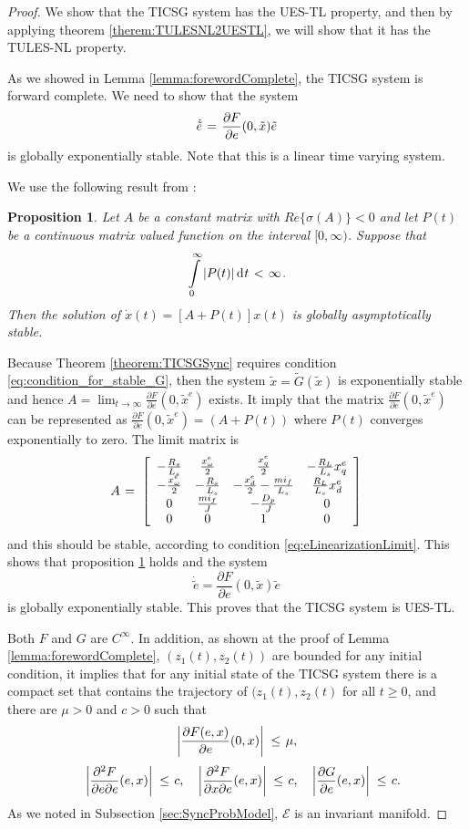 \documentclass[letterpaper, 10 pt, conference]{ieeeconf}
\newtheorem{proposition}[theorem]{Proposition}
\renewcommand{\o}    {{\omega}}
\newcommand{\m}      {{\hbox{\hskip 1pt}}}
\newcommand{\dd}     {{\rm d\hbox{\hskip 0.5pt}}}
\newcommand{\Emscr}  {{\mathcal{E}}}
\begin{document}
\begin{proof}
We show that the TICSG system has the UES-TL property, and then by
applying theorem \ref{therem:TULESNL2UESTL}, we will show that it has
the TULES-NL property.

As we showed in Lemma \ref{lemma:forewordComplete}, the TICSG system
is forward complete. We need to show that the system
$$ \dot{\tilde{e}} \m=\m \frac{\partial F}{\partial e}(0,\tilde{x})
   \tilde{e}$$
is globally exponentially stable. Note that this is a linear time
varying system.

We use the following result from \cite[Theorem 4.2.7]
{SchovanecGilliam1999}:

\begin{proposition}\label{proposition:LTVStability}
Let $A$ be a constant matrix with $Re\{\sigma(A)\}<0$ and let $P(t)$
be a continuous matrix valued function on the interval
$[0,\infty)$. Suppose that
$$\intop_0^\infty \left|P(t)\right| \dd t \m<\m \infty \m.$$
Then the solution of $\dot{x}(t)=[A+P(t)]x(t)$ is globally 
asymptotically stable.
\end{proposition}
 
Because Theorem \ref{theorem:TICSGSync} requires condition
\eqref{eq:condition_for_stable_G}, then the system $\tilde{x}=
\tilde{G}(\tilde{x})$ is exponentially stable and hence $A =
\lim_{t \to \infty}\frac{\partial F}{\partial e}(0,\tilde{x}^e)$
exists.  It imply that the matrix $\frac{\partial F}{\partial
e}(0,\tilde{x}^e)$ can be represented as $\frac{\partial F}{\partial
e}(0,\tilde{x}^e) = \left(A+P(t)\right)$ where $P(t)$ converges
exponentially to zero. The limit matrix is
$$ A \m=\m \left[\begin{array}{cccc} -\frac{R_{s}}{L_s} & 
   \frac{x^e_\o}{2} & \frac{x^e_q}{2} & -\frac{R_L}{L_s} x^e_q\\
   -\frac{x^e_\o}{2} & -\frac{R_s}{L_s} & -\frac{x^e_d}{2}-\frac
   {mi_f}{L_s} & \frac{R_L}{L_s} x^e_d\\ 0 & \frac{mi_f}{J} & 
   -\frac{D_p}{J} & 0\\ 0 & 0 & 1 & 0 \end{array}\right]$$
and this should be stable, according to condition
\eqref{eq:eLinearizationLimit}. This shows that proposition
\ref{proposition:LTVStability} holds and the system
$$ \dot{\tilde{e}}=\frac{\partial F}{\partial e}(0,\tilde{x})
   \tilde{e}$$
is globally exponentially stable. This proves that the TICSG system
is UES-TL. 

Both $F$ and $G$ are $C^\infty$. In addition, as shown at the proof of
Lemma \ref{lemma:forewordComplete}, $\left(z_1(t),z_2(t)\right)$ are
bounded for any initial condition, it implies that for any initial
state of the TICSG system there is a compact set that contains the
trajectory of $(z_1(t),z_2(t)$ for all $t\geq 0$, and there are
$\mu>0$ and $c>0$ such that
$$\left|\frac{\partial F(e,x)}{\partial e}(0,x)\right| \m\leq\m \mu,$$
$$ \quad \left| \frac{\partial^2 F}{\partial e \partial e}(e,x)\right|
   \m\leq\m c, \quad \left| \frac{\partial^2 F}{\partial x \partial e}
   (e,x)\right| \m\leq\m c,\quad\left| \frac{\partial G}{\partial e}
   (e,x) \right| \m\leq\m c.$$
As we noted in Subsection \ref{sec:SyncProbModel}, $\Emscr$ is an 
invariant manifold.


\end{proof}
\end{document}
